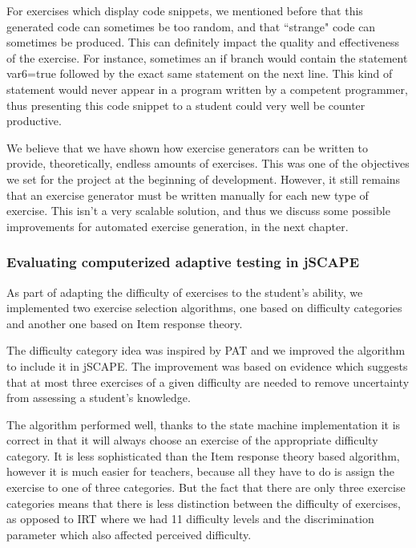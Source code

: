 For exercises which display code snippets, we mentioned before that this generated code can sometimes be too random, and that ``strange" code can sometimes be produced. This can definitely impact the quality and effectiveness of the exercise. For instance, sometimes an \textsf{if} branch would contain the statement \textsf{var6=true} followed by the exact same statement on the next line. This kind of statement would never appear in a program written by a competent programmer, thus presenting this code snippet to a student could very well be counter productive. \newline

We believe that we have shown how exercise generators can be written to provide, theoretically, endless amounts of exercises. This was one of the objectives we set for the project at the beginning of development. However, it still remains that an exercise generator must be written manually for each new type of exercise. This isn't a very scalable solution, and thus we discuss some possible improvements for automated exercise generation, in the next chapter.

\subsubsection{Evaluating computerized adaptive testing in jSCAPE}
As part of adapting the difficulty of exercises to the student's ability, we implemented two exercise selection algorithms, one based on difficulty categories and another one based on Item response theory.\newline

The difficulty category idea was inspired by PAT\cite{PAT} and we improved the algorithm to include it in jSCAPE. The improvement was based on evidence\cite{Abdullah} which suggests that at most three exercises of a given difficulty are needed to remove uncertainty from assessing a student's knowledge.\newline

The algorithm performed well, thanks to the state machine implementation it is correct in that it will always choose an exercise of the appropriate difficulty category. It is less sophisticated than the Item response theory based algorithm, however it is much easier for teachers, because all they have to do is assign the exercise to one of three categories. But the fact that there are only three exercise categories means that there is less distinction between the difficulty of exercises, as opposed to IRT where we had 11 difficulty levels and the discrimination parameter which also affected perceived difficulty.\newline

